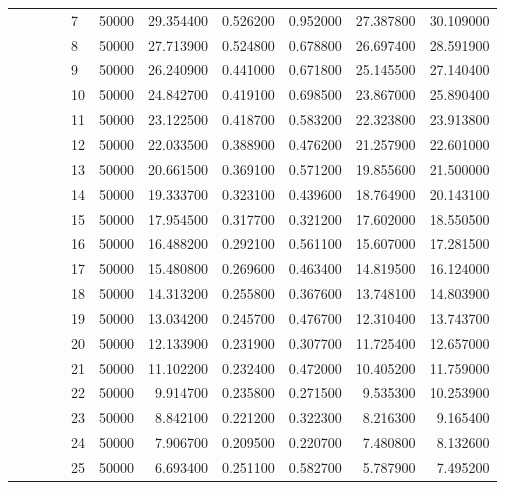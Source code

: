 \begin{tabular}{llllllrrrrr}
\cline{5-11}
 &  &  &  & 7 & 50000 & 29.354400 & 0.526200 & 0.952000 & 27.387800 & 30.109000 \\
\cline{5-11}
 &  &  &  & 8 & 50000 & 27.713900 & 0.524800 & 0.678800 & 26.697400 & 28.591900 \\
\cline{5-11}
 &  &  &  & 9 & 50000 & 26.240900 & 0.441000 & 0.671800 & 25.145500 & 27.140400 \\
\cline{5-11}
 &  &  &  & 10 & 50000 & 24.842700 & 0.419100 & 0.698500 & 23.867000 & 25.890400 \\
\cline{5-11}
 &  &  &  & 11 & 50000 & 23.122500 & 0.418700 & 0.583200 & 22.323800 & 23.913800 \\
\cline{5-11}
 &  &  &  & 12 & 50000 & 22.033500 & 0.388900 & 0.476200 & 21.257900 & 22.601000 \\
\cline{5-11}
 &  &  &  & 13 & 50000 & 20.661500 & 0.369100 & 0.571200 & 19.855600 & 21.500000 \\
\cline{5-11}
 &  &  &  & 14 & 50000 & 19.333700 & 0.323100 & 0.439600 & 18.764900 & 20.143100 \\
\cline{5-11}
 &  &  &  & 15 & 50000 & 17.954500 & 0.317700 & 0.321200 & 17.602000 & 18.550500 \\
\cline{5-11}
 &  &  &  & 16 & 50000 & 16.488200 & 0.292100 & 0.561100 & 15.607000 & 17.281500 \\
\cline{5-11}
 &  &  &  & 17 & 50000 & 15.480800 & 0.269600 & 0.463400 & 14.819500 & 16.124000 \\
\cline{5-11}
 &  &  &  & 18 & 50000 & 14.313200 & 0.255800 & 0.367600 & 13.748100 & 14.803900 \\
\cline{5-11}
 &  &  &  & 19 & 50000 & 13.034200 & 0.245700 & 0.476700 & 12.310400 & 13.743700 \\
\cline{5-11}
 &  &  &  & 20 & 50000 & 12.133900 & 0.231900 & 0.307700 & 11.725400 & 12.657000 \\
\cline{5-11}
 &  &  &  & 21 & 50000 & 11.102200 & 0.232400 & 0.472000 & 10.405200 & 11.759000 \\
\cline{5-11}
 &  &  &  & 22 & 50000 & 9.914700 & 0.235800 & 0.271500 & 9.535300 & 10.253900 \\
\cline{5-11}
 &  &  &  & 23 & 50000 & 8.842100 & 0.221200 & 0.322300 & 8.216300 & 9.165400 \\
\cline{5-11}
 &  &  &  & 24 & 50000 & 7.906700 & 0.209500 & 0.220700 & 7.480800 & 8.132600 \\
\cline{5-11}
 &  &  &  & 25 & 50000 & 6.693400 & 0.251100 & 0.582700 & 5.787900 & 7.495200 \\
\cline{4-11} \cline{5-11}

\end{tabular}
